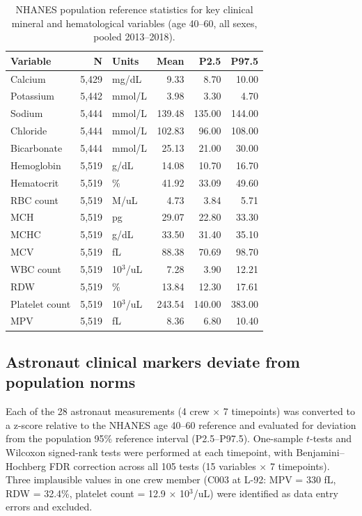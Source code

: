 \documentclass[11pt,a4paper]{article}
\begin{document}
\begin{table}[H]
\centering
\caption{NHANES population reference statistics for key clinical mineral and hematological variables (age 40--60, all sexes, pooled 2013--2018).}
\label{tab:nhanes_ref}
\begin{tabular}{lrlrrr}
\toprule
\textbf{Variable} & \textbf{N} & \textbf{Units} & \textbf{Mean} & \textbf{P2.5} & \textbf{P97.5} \\
\midrule
Calcium & 5,429 & mg/dL & 9.33 & 8.70 & 10.00 \\
Potassium & 5,442 & mmol/L & 3.98 & 3.30 & 4.70 \\
Sodium & 5,444 & mmol/L & 139.48 & 135.00 & 144.00 \\
Chloride & 5,444 & mmol/L & 102.83 & 96.00 & 108.00 \\
Bicarbonate & 5,444 & mmol/L & 25.13 & 21.00 & 30.00 \\
Hemoglobin & 5,519 & g/dL & 14.08 & 10.70 & 16.70 \\
Hematocrit & 5,519 & \% & 41.92 & 33.09 & 49.60 \\
RBC count & 5,519 & M/uL & 4.73 & 3.84 & 5.71 \\
MCH & 5,519 & pg & 29.07 & 22.80 & 33.30 \\
MCHC & 5,519 & g/dL & 33.50 & 31.40 & 35.10 \\
MCV & 5,519 & fL & 88.38 & 70.69 & 98.70 \\
WBC count & 5,519 & 10$^3$/uL & 7.28 & 3.90 & 12.21 \\
RDW & 5,519 & \% & 13.84 & 12.30 & 17.61 \\
Platelet count & 5,519 & 10$^3$/uL & 243.54 & 140.00 & 383.00 \\
MPV & 5,519 & fL & 8.36 & 6.80 & 10.40 \\
\bottomrule
\end{tabular}
\end{table}

\subsection{Astronaut clinical markers deviate from population norms}

Each of the 28 astronaut measurements (4 crew $\times$ 7 timepoints) was converted to a z-score relative to the NHANES age 40--60 reference and evaluated for deviation from the population 95\% reference interval (P2.5--P97.5). One-sample $t$-tests and Wilcoxon signed-rank tests were performed at each timepoint, with Benjamini--Hochberg FDR correction across all 105 tests (15 variables $\times$ 7 timepoints). Three implausible values in one crew member (C003 at L-92: MPV = 330 fL, RDW = 32.4\%, platelet count = 12.9 $\times$ 10$^3$/uL) were identified as data entry errors and excluded.
\end{document}
